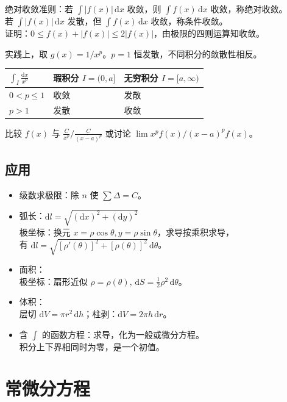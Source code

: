 \documentclass[12pt, a4paper, UTF8, openany]{ctexbook}
\newcommand{\dif}{\mathrm{d}}
\newcommand{\difx}{\,\mathrm{d}x}
\begin{document}
        绝对收敛准则：若 $\int |f(x)|\difx$ 收敛，则 $\int f(x)\difx$ 收敛，称绝对收敛。\\
        若 $\int |f(x)|\difx$ 发散，但 $\int f(x)\difx$ 收敛，称条件收敛。\\
        证明：$0 \leqslant f(x) + |f(x)| \leqslant 2|f(x)|$，由极限的四则运算知收敛。

        实践上，取 $g(x) = 1 / x^p$。$p = 1$ 恒发散，不同积分的敛散性相反。
        \begin{longtable}[h]{w{c}{2cm}*{2}{|w{c}{6cm}}}
            $\int_I \frac{\dif x}{x^p}$ & 瑕积分 $I = (0, a]$ & 无穷积分 $I = [a, \infty)$ \\
            \midrule
            $0 < p \leqslant 1$         & 收敛                & 发散 \\
            \midrule
            $p > 1$                     & 发散                & 收敛 
        \end{longtable}

        比较 $f(x)$ 与 $\frac{C}{x^p} / \frac{C}{(x - a)^p}$ 或讨论 $\lim x^pf(x) / (x - a)^pf(x)$。
        
    \section{应用}
    \begin{itemize}
        \item 级数求极限：除 $n$ 使 $\sum \Delta = C$。
        \item 弧长：$\dif l = \sqrt{(\dif x)^2 + (\dif y)^2}$\\
            极坐标：换元 $x = \rho\cos\theta, y = \rho\sin\theta$，求导按乘积求导，\\
                有 $\dif l = \sqrt{[\rho'(\theta)]^2 + [\rho(\theta)]^2}\,\dif\theta$。
        \item 面积：\\
            极坐标：扇形近似 $\rho = \rho(\theta), \, \dif S = \frac{1}{2} \rho^2 \,\dif\theta$。
        \item 体积：\\
            层切 $\dif V = \pi r^2 \,\dif h$；柱剥：$\dif V = 2\pi h \,\dif r$。
        \item 含 $\int$ 的函数方程：求导，化为一般或微分方程。\\
            {\heiti 积分上下界相同}时为零，是一个{\heiti 初值}。
    \end{itemize}

    \chapter{常微分方程}
\end{document}
